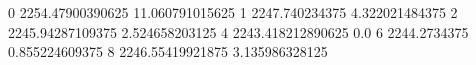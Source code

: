0 2254.47900390625 11.060791015625
1 2247.740234375 4.322021484375
2 2245.94287109375 2.524658203125
4 2243.418212890625 0.0
6 2244.2734375 0.855224609375
8 2246.55419921875 3.135986328125
